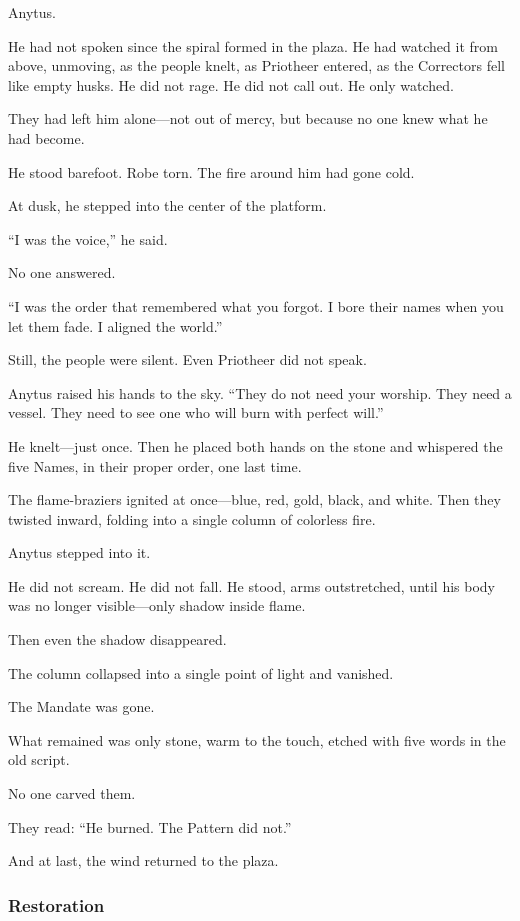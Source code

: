 \documentclass[12pt]{article}
\begin{document}
Anytus.

He had not spoken since the spiral formed in the plaza. He had watched it from above, unmoving, as the people knelt, as Priotheer entered, as the Correctors fell like empty husks. He did not rage. He did not call out. He only watched.

They had left him alone—not out of mercy, but because no one knew what he had become.

He stood barefoot. Robe torn. The fire around him had gone cold.

At dusk, he stepped into the center of the platform.

“I was the voice,” he said.

No one answered.

“I was the order that remembered what you forgot. I bore their names when you let them fade. I aligned the world.”

Still, the people were silent. Even Priotheer did not speak.

Anytus raised his hands to the sky. “They do not need your worship. They need a vessel. They need to see one who will burn with perfect will.”

He knelt—just once. Then he placed both hands on the stone and whispered the five Names, in their proper order, one last time.

The flame-braziers ignited at once—blue, red, gold, black, and white. Then they twisted inward, folding into a single column of colorless fire.

Anytus stepped into it.

He did not scream. He did not fall. He stood, arms outstretched, until his body was no longer visible—only shadow inside flame.

Then even the shadow disappeared.

The column collapsed into a single point of light and vanished.

The Mandate was gone.

What remained was only stone, warm to the touch, etched with five words in the old script.

No one carved them.

They read: “He burned. The Pattern did not.”

And at last, the wind returned to the plaza.

\dotfill

\subsubsection*{Restoration}
\end{document}
